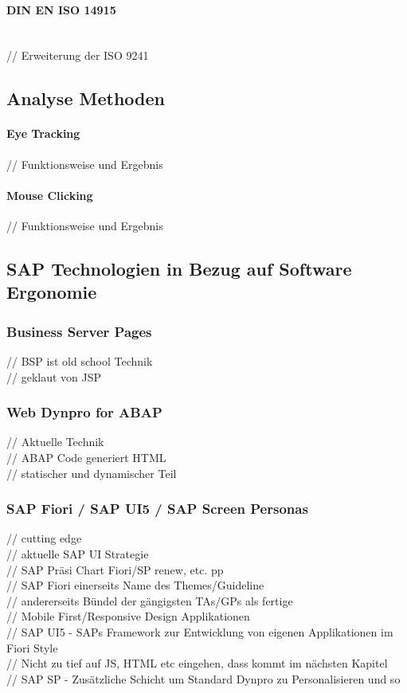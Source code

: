 \documentclass[12pt,a4paper,bibliography=totocnumbered,listof=totocnumbered]{scrartcl}
\begin{document}
\paragraph{DIN EN ISO 14915}
$\;$ \\
// Erweiterung der ISO 9241\\

\subsection{Analyse Methoden}
\paragraph{Eye Tracking}
// Funktionsweise und Ergebnis\\

\paragraph{Mouse Clicking}
// Funktionsweise und Ergebnis\\

\subsection{SAP Technologien in Bezug auf Software Ergonomie}
\subsubsection{Business Server Pages}
// \ac{BSP} ist old school Technik\\
// geklaut von \ac{JSP}\\

\subsubsection{Web Dynpro for ABAP}
// Aktuelle Technik\\
// ABAP Code generiert HTML\\
// statischer und dynamischer Teil\\

\subsubsection{SAP Fiori / SAP UI5 / SAP Screen Personas}
// cutting edge\\
// aktuelle SAP UI Strategie\\
// SAP Präsi Chart Fiori/SP renew, etc. pp\\
// SAP Fiori einerseits Name des Themes/Guideline\\
// andererseits Bündel der gängigsten TAs/GPs als fertige\\
// Mobile First/Responsive Design Applikationen\\
// SAP UI5 - SAPs Framework zur Entwicklung von eigenen Applikationen im Fiori Style\\
// Nicht zu tief auf JS, HTML etc eingehen, dass kommt im nächsten Kapitel\\
// SAP SP - Zusätzliche Schicht um Standard Dynpro zu Personalisieren und so\\
\pagebreak
\end{document}
